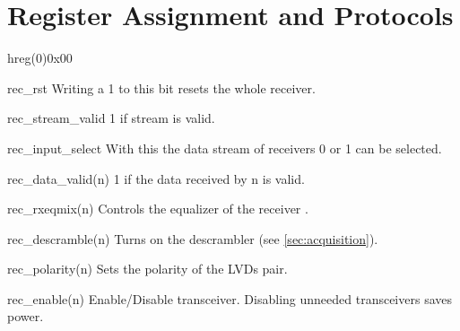 \documentclass[12pt,a4paper,parskip=full,abstract=true,BCOR=12mm,twoside,open=right]{scrreprt}
\begin{document}
\section{Register Assignment and Protocols}
\label{sec:registers}
\begin{register}{h}{reg(0)}{0x00}%
    \label{reg0}%
    \regnewline%
    \begin{regdesc}\begin{reglist}
        \item[rec\_rst] Writing a 1 to this bit resets the whole receiver.
        \item[rec\_stream\_valid] 1 if stream is valid.
        \item[rec\_input\_select] With this the data stream of receivers 0 or 1
            can be selected.
        \item[rec\_data\_valid(n)] 1 if the data received by n is valid.
        \item[rec\_rxeqmix(n)] Controls the equalizer of the receiver
            \cite{gtx}.
        \item[rec\_descramble(n)] Turns on the descrambler (see
            \cref{sec:acquisition}).
        \item[rec\_polarity(n)] Sets the polarity of the LVDs pair.
        \item[rec\_enable(n)] Enable/Disable transceiver. Disabling unneeded
            transceivers saves power.
    \end{reglist}\end{regdesc}
\end{register}
\end{document}
